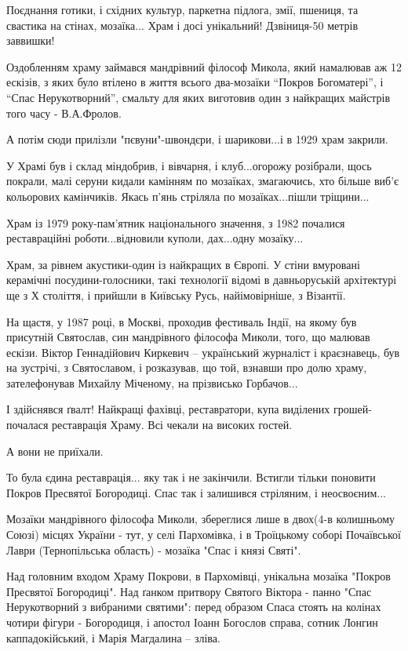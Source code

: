 Поєднання готики, і східних культур, паркетна підлога, змії, пшениця, та
свастика на стінах, мозаїка...  Храм і досі унікальний! Дзвіниця-50 метрів
заввишки! 

Оздобленням храму займався мандрівний філософ Микола, який намалював аж 12
ескізів, з яких було втілено в життя всього два-мозаїки “Покров Богоматері”, і
“Спас Нерукотворний”, смальту для яких виготовив один з найкращих майстрів того
часу - В.А.Фролов.  

А потім сюди прилізли "пєвуни"-швондєри, і шарикови...і в 1929 храм закрили.

У Храмі був і склад міндобрив, і вівчарня, і клуб...огорожу розібрали, щось
покрали, малі серуни кидали камінням по мозаїках, змагаючись, хто більше виб'є
кольорових камінчиків. Якась п'янь стріляла по мозаїках...пішли тріщини...

Храм із 1979 року-пам'ятник національного значення, з 1982 почалися
реставраційні роботи...відновили куполи, дах...одну мозаїку...

Храм, за рівнем акустики-один із найкращих в Європі. У стіни вмуровані
керамічні посудини-голосники, такі технології відомі в давньоруській
архітектурі ще з Х століття, і прийшли в Київську Русь, найімовірніше, з
Візантії.

На щастя, у 1987 році, в Москві, проходив фестиваль Індії, на якому був
присутній Святослав, син мандрівного філософа Миколи, того, що малював ескізи.
Віктор Геннадійович Киркевич – український журналіст і краєзнавець, був на
зустрічі, з Святославом, і розказував, що той, взнавши про долю храму,
зателефонував Михайлу Міченому, на прізвисько Горбачов...

І здійснявся ґвалт! Найкращі фахівці, реставратори, купа виділених
грошей-почалася реставрація Храму. Всі чекали на високих гостей.

А вони не приїхали.

То була єдина реставрація... яку так і не закінчили. Встигли тільки поновити
Покров Пресвятої Богородиці. Спас так і залишився стріляним, і неосвоєним...

Мозаїки мандрівного філософа Миколи, збереглися лише в двох(4-в колишньому
Союзі) місцях України - тут, у селі Пархомівка, і в Троїцькому соборі Почаївської
Лаври (Тернопільська область) - мозаїка "Спас і князі Святі".

Над головним входом Храму Покрови, в Пархомівці, унікальна мозаїка "Покров
Пресвятої Богородиці". Над ґанком притвору Святого Віктора - панно "Спас
Нерукотворний з вибраними святими": перед образом Спаса стоять на колінах
чотири фігури - Богородиця, і апостол Іоанн Богослов справа, сотник Лонгин
каппадокійський, і Марія Магдалина – зліва. 

